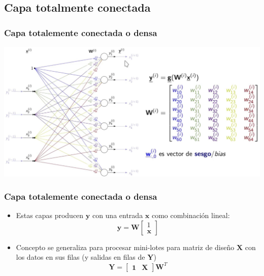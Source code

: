 \documentclass[svgnames,12pt,aspectratio=149]{beamer}
\begin{document}
\subsection{Capa totalmente conectada}
\begin{frame}
  \frametitle{Capa totalemente conectada o densa}
  \includegraphics[width= \textwidth]{im2}
  
\end{frame}
\begin{frame}
  \frametitle{Capa totalemente conectada o densa}
\begin{itemize}
\item Estas capas producen $\boldsymbol{y}$ con una entrada $\boldsymbol{x}$ como combinación lineal:
\begin{equation*}
\boldsymbol{y}=\boldsymbol{W} \begin{bmatrix} 1 \\ \boldsymbol{x} \end{bmatrix}
\end{equation*}
\item Concepto se generaliza para procesar mini-lotes para matriz de diseño $\boldsymbol{X}$ con los datos en sus filas (y salidas en filas de $\boldsymbol{Y} $) 
\begin{equation*}
\boldsymbol{Y}= \begin{bmatrix} \textbf{1} & \boldsymbol{X} \end{bmatrix} \boldsymbol{W}^T
\end{equation*}
\end{itemize}
  
\end{frame}
\end{document}
